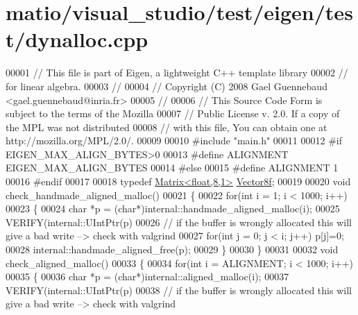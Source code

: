 \hypertarget{matio_2visual__studio_2test_2eigen_2test_2dynalloc_8cpp_source}{}\section{matio/visual\+\_\+studio/test/eigen/test/dynalloc.cpp}
\label{matio_2visual__studio_2test_2eigen_2test_2dynalloc_8cpp_source}

\begin{DoxyCode}
00001 \textcolor{comment}{// This file is part of Eigen, a lightweight C++ template library}
00002 \textcolor{comment}{// for linear algebra.}
00003 \textcolor{comment}{//}
00004 \textcolor{comment}{// Copyright (C) 2008 Gael Guennebaud <gael.guennebaud@inria.fr>}
00005 \textcolor{comment}{//}
00006 \textcolor{comment}{// This Source Code Form is subject to the terms of the Mozilla}
00007 \textcolor{comment}{// Public License v. 2.0. If a copy of the MPL was not distributed}
00008 \textcolor{comment}{// with this file, You can obtain one at http://mozilla.org/MPL/2.0/.}
00009 
00010 \textcolor{preprocessor}{#include "main.h"}
00011 
00012 \textcolor{preprocessor}{#if EIGEN\_MAX\_ALIGN\_BYTES>0}
00013 \textcolor{preprocessor}{#define ALIGNMENT EIGEN\_MAX\_ALIGN\_BYTES}
00014 \textcolor{preprocessor}{#else}
00015 \textcolor{preprocessor}{#define ALIGNMENT 1}
00016 \textcolor{preprocessor}{#endif}
00017 
00018 \textcolor{keyword}{typedef} \hyperlink{group___core___module}{Matrix<float,8,1>} \hyperlink{group___core___module}{Vector8f};
00019 
00020 \textcolor{keywordtype}{void} check\_handmade\_aligned\_malloc()
00021 \{
00022   \textcolor{keywordflow}{for}(\textcolor{keywordtype}{int} i = 1; i < 1000; i++)
00023   \{
00024     \textcolor{keywordtype}{char} *p = (\textcolor{keywordtype}{char}*)internal::handmade\_aligned\_malloc(i);
00025     VERIFY(internal::UIntPtr(p)%
00026     \textcolor{comment}{// if the buffer is wrongly allocated this will give a bad write --> check with valgrind}
00027     \textcolor{keywordflow}{for}(\textcolor{keywordtype}{int} j = 0; j < i; j++) p[j]=0;
00028     internal::handmade\_aligned\_free(p);
00029   \}
00030 \}
00031 
00032 \textcolor{keywordtype}{void} check\_aligned\_malloc()
00033 \{
00034   \textcolor{keywordflow}{for}(\textcolor{keywordtype}{int} i = ALIGNMENT; i < 1000; i++)
00035   \{
00036     \textcolor{keywordtype}{char} *p = (\textcolor{keywordtype}{char}*)internal::aligned\_malloc(i);
00037     VERIFY(internal::UIntPtr(p)%
00038     \textcolor{comment}{// if the buffer is wrongly allocated this will give a bad write --> check with valgrind}

\end{DoxyCode}
